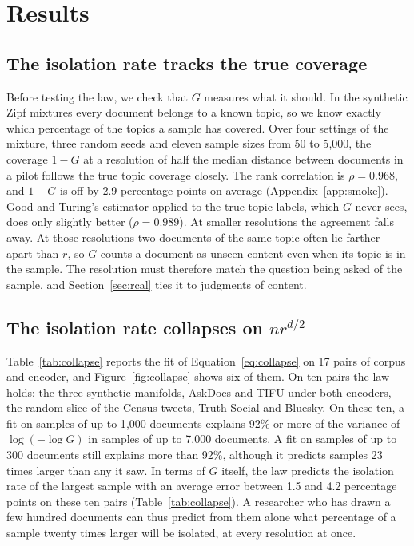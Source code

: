 \section{Results}

\subsection{The isolation rate tracks the true coverage}

Before testing the law, we check that $G$ measures what it should. In the synthetic Zipf mixtures every document belongs to a known topic, so we know exactly which percentage of the topics a sample has covered. Over four settings of the mixture, three random seeds and eleven sample sizes from 50 to 5{,}000, the coverage $1 - G$ at a resolution of half the median distance between documents in a pilot follows the true topic coverage closely. The rank correlation is $\rho = 0.968$, and $1 - G$ is off by 2.9 percentage points on average (Appendix~\ref{app:smoke}). Good and Turing's estimator applied to the true topic labels, which $G$ never sees, does only slightly better ($\rho = 0.989$). At smaller resolutions the agreement falls away. At those resolutions two documents of the same topic often lie farther apart than $r$, so $G$ counts a document as unseen content even when its topic is in the sample. The resolution must therefore match the question being asked of the sample, and Section~\ref{sec:rcal} ties it to judgments of content.

\subsection{The isolation rate collapses on $n r^{d/2}$}
\label{sec:collapse}

Table~\ref{tab:collapse} reports the fit of Equation~\ref{eq:collapse} on 17 pairs of corpus and encoder, and Figure~\ref{fig:collapse} shows six of them. On ten pairs the law holds: the three synthetic manifolds, AskDocs and TIFU under both encoders, the random slice of the Census tweets, Truth Social and Bluesky. On these ten, a fit on samples of up to 1{,}000 documents explains 92\% or more of the variance of $\log(-\log G)$ in samples of up to 7{,}000 documents. A fit on samples of up to 300 documents still explains more than 92\%, although it predicts samples 23 times larger than any it saw. In terms of $G$ itself, the law predicts the isolation rate of the largest sample with an average error between 1.5 and 4.2 percentage points on these ten pairs (Table~\ref{tab:collapse}). A researcher who has drawn a few hundred documents can thus predict from them alone what percentage of a sample twenty times larger will be isolated, at every resolution at once.

